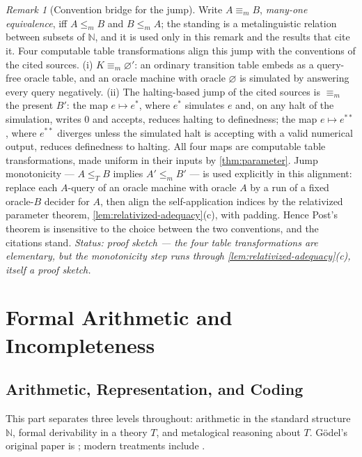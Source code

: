 \documentclass[11pt,oneside,openany]{book}
\theoremstyle{definition}
\theoremstyle{plain}
\theoremstyle{remark}
\newtheorem{remark}[definition]{Remark}
\newcommand{\N}{\mathbb{N}}
\begin{document}
\begin{remark}[Convention bridge for the jump]
\label{rem:jump-convention}
Write \(A\equiv_m B\), \emph{many-one equivalence}, iff
\(A\leq_m B\) and \(B\leq_m A\); the standing is a metalinguistic relation
between subsets of \(\N\), and it is used only in this remark and the
results that cite it.  Four computable table transformations align this
jump with the conventions of the cited sources.  (i)
\(K\equiv_m\varnothing'\): an
ordinary transition table embeds as a query-free oracle table, and an
oracle machine with oracle \(\varnothing\) is simulated by answering
every query negatively.  (ii) The halting-based jump of the cited sources
is \(\equiv_m\) the present \(B'\): the map \(e\mapsto e^*\), where
\(e^*\) simulates \(e\) and, on any halt of the simulation, writes \(0\)
and accepts, reduces halting to definedness; the map
\(e\mapsto e^{**}\), where \(e^{**}\) diverges unless the simulated halt
is accepting with a valid numerical output, reduces definedness to
halting.  All four maps are computable table transformations, made
uniform in their inputs by \cref{thm:parameter}.  Jump monotonicity ---
\(A\leq_T B\) implies \(A'\leq_m B'\) --- is used explicitly in this
alignment: replace each \(A\)-query of an oracle machine with oracle
\(A\) by a run of a fixed oracle-\(B\) decider for \(A\), then align the
self-application indices by the relativized parameter theorem,
\cref{lem:relativized-adequacy}(c), with padding.  Hence Post's theorem
is insensitive to the choice between the two conventions, and the
citations stand.
\textit{Status: proof sketch --- the four table transformations are
elementary, but the monotonicity step runs through
\cref{lem:relativized-adequacy}(c), itself a proof sketch.}
\end{remark}

\part{Formal Arithmetic and Incompleteness}
\label{part:incompleteness}

\chapter{Arithmetic, Representation, and Coding}
\label{ch:arithmetic-coding}

This part separates three levels throughout: arithmetic in the standard
structure \(\N\), formal derivability in a theory \(T\), and metalogical
reasoning about \(T\).  G\"odel's original paper is \cite{Godel1931}; modern
treatments include \cite{Shoenfield1967,BoolosBurgessJeffrey2007}.
\end{document}
